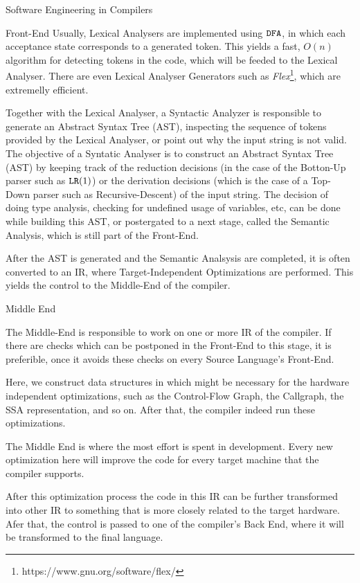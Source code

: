 \begin{section}{Software Engineering in Compilers}
\begin{subsection}{Front-End}
Usually, Lexical Analysers are implemented using $\texttt{DFA}$, in which each
acceptance state corresponds to a generated token. This yields a fast,
$O(n)$ algorithm for detecting tokens in the code, which will be feeded
to the Lexical Analyser. There are even Lexical Analyser Generators such
as \textit{Flex}\footnote{https://www.gnu.org/software/flex/}, which
are extremelly efficient.

Together with the Lexical Analyser, a Syntactic Analyzer is responsible to
generate an Abstract Syntax Tree (AST), inspecting the sequence of tokens
provided by the Lexical Analyser, or point out why the input string is
not valid. The objective of a Syntatic Analyser is to construct
an Abstract Syntax Tree (AST) by keeping track of the reduction decisions
(in the case of the Botton-Up parser such as $\texttt{LR}(1)$) or the derivation
decisions (which is the case of a Top-Down parser such as Recursive-Descent)
of the input string. The decision of doing type analysis, checking for
undefined usage of variables, etc, can be done while building this
AST, or postergated to a next stage, called the Semantic Analysis,
which is still part of the Front-End.

After the AST is generated and the Semantic Analsysis are completed, it is
often converted to an IR, where Target-Independent
Optimizations are performed. This yields the control to the Middle-End of
the compiler.

\end{subsection}

\begin{subsection}{Middle End}

The Middle-End is responsible to work on one or more IR
of the compiler. If there are checks which can be postponed in the Front-End
to this stage, it is preferible, once it avoids these checks on every Source
Language's Front-End.

Here, we construct data structures in which might be necessary for the hardware
independent optimizations, such as the Control-Flow Graph, the Callgraph, the
SSA representation, and so on. After that, the compiler indeed run these optimizations.

The Middle End is where the most effort is spent in development. Every new
optimization here will improve the code for every target machine that the
compiler supports.

After this optimization process the code in this IR can be further transformed
into other IR to something that is more closely related to the target hardware.
Afer that, the control is passed to one of the compiler's Back End, where it will
be transformed to the final language.


\end{subsection}
\end{section}
